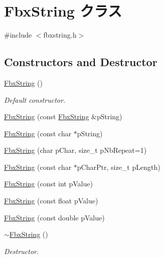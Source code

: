 \hypertarget{class_fbx_string}{}\section{Fbx\+String クラス}
\label{class_fbx_string}


{\ttfamily \#include $<$fbxstring.\+h$>$}

\subsection*{Constructors and Destructor}
\begin{DoxyCompactItemize}
\item 
\hyperlink{class_fbx_string_af7a39b49d5e2238203b42c830a6a28f3}{Fbx\+String} ()
\begin{DoxyCompactList}\small\item\em Default constructor. \end{DoxyCompactList}\item 
\hyperlink{class_fbx_string_a7d4974cb96793041faf74947ddebd4ce}{Fbx\+String} (const \hyperlink{class_fbx_string}{Fbx\+String} \&p\+String)
\item 
\hyperlink{class_fbx_string_ac13dc02cce30f3c297a7f38019dc38ab}{Fbx\+String} (const char $\ast$p\+String)
\item 
\hyperlink{class_fbx_string_a84c809ef712c772fedff9a295378893e}{Fbx\+String} (char p\+Char, size\+\_\+t p\+Nb\+Repeat=1)
\item 
\hyperlink{class_fbx_string_a2aa49fbace620d2bb3ac76e01e02673d}{Fbx\+String} (const char $\ast$p\+Char\+Ptr, size\+\_\+t p\+Length)
\item 
\hyperlink{class_fbx_string_a8db1298a9f9580d2511fa28ac8cd2f0f}{Fbx\+String} (const int p\+Value)
\item 
\hyperlink{class_fbx_string_ada766330be76ca59b423fbb11adf2181}{Fbx\+String} (const float p\+Value)
\item 
\hyperlink{class_fbx_string_a9430a89dc9eac29f35291de87491691b}{Fbx\+String} (const double p\+Value)
\item 
\hyperlink{class_fbx_string_a36df0b9249f7987f157291b6246b7662}{$\sim$\+Fbx\+String} ()
\begin{DoxyCompactList}\small\item\em Destructor. \end{DoxyCompactList}\end{DoxyCompactItemize}
